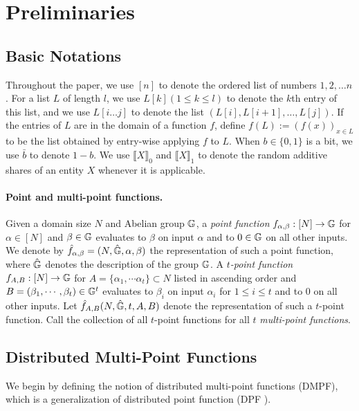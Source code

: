 \section{Preliminaries}
\subsection{Basic Notations}
Throughout the paper, we use $[n]$ to denote the ordered list of numbers $1,2,\dots n$. For a list $L$ of length $l$, we use $L[k] (1\le k\le l)$ to denote the $k$th entry of this list, and we use $L[i\dots j]$ to denote the list $(L[i],L[i+1],\dots,L[j])$. If the entries of $L$ are in the domain of a function $f$, define $f(L) := (f(x))_{x\in L}$ to be the list obtained by entry-wise applying $f$ to $L$. When $b\in\{0,1\}$ is a bit, we use $\bar{b}$ to denote $1-b$. We use $\llbracket X\rrbracket_0$ and $\llbracket X\rrbracket_1$ to denote the random additive shares of an entity $X$ whenever it is applicable. 

\paragraph{Point and multi-point functions. }Given a domain size $N$ and Abelian group $\mathbb{G}$, a \emph{point function} $f_{\alpha,\beta}:[N]\rightarrow\mathbb{G}$ for $\alpha\in[N]$ and $\beta\in\mathbb{G}$ evaluates to $\beta$ on input $\alpha$ and to $0\in\mathbb{G}$ on all other inputs. We denote by $\hat{f}_{\alpha,\beta}=(N,\hat{\mathbb{G}},\alpha,\beta)$ the representation of such a point function, where $\hat{\mathbb{G}}$ denotes the description of the group $\mathbb{G}$. A \emph{$t$-point function} $f_{A,B}:[N]\rightarrow \mathbb{G}$ for $A=\{\alpha_1,\cdots\alpha_t\}\subset N$ listed in ascending order and $B=(\beta_1,\cdots,\beta_t)\in \mathbb{G}^t$ evaluates to $\beta_i$ on input $\alpha_i$ for $1\le i\le t$ and to $0$ on all other inputs. Let $\hat{f}_{A,B}(N,\hat{\mathbb{G}},t,A,B)$ denote the representation of such a $t$-point function. Call the collection of all $t$-point functions for all $t$ \emph{multi-point functions}. 

\subsection{Distributed Multi-Point Functions}

We begin by defining the notion of distributed multi-point functions (DMPF), which is a generalization of distributed point function (DPF \cite{10.1007/978-3-662-46803-6_12,BoyGilIsh16}).

